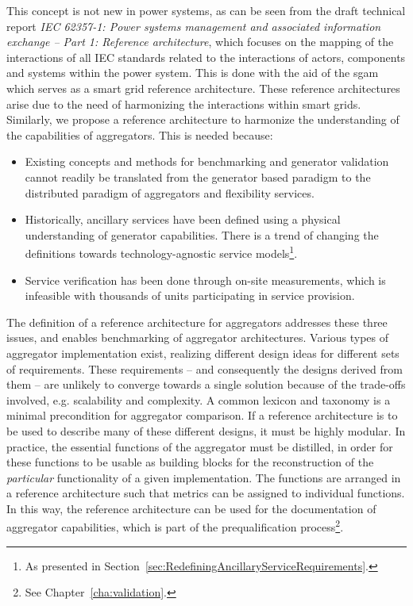This concept is not new in power systems, as can be seen from the draft technical report \emph{IEC 62357-1: Power systems management and associated information exchange -- Part 1: Reference architecture}, which focuses on the mapping of the interactions of all IEC standards related to the interactions of actors, components and systems within the power system. This is done with the aid of the \gls{sgam} which serves as a smart grid reference architecture. These reference architectures arise due to the need of harmonizing the interactions within smart grids. Similarly, we propose a reference architecture to harmonize the understanding of the capabilities of aggregators. This is needed because:
\begin{itemize}
	\item Existing concepts and methods for benchmarking and generator validation cannot readily be translated from the generator based paradigm to the distributed paradigm of aggregators and flexibility services.
	\item Historically, ancillary services have been defined using a physical understanding of generator capabilities. There is a trend of changing the definitions towards technology-agnostic service models\footnote{As presented in Section~\ref{sec:RedefiningAncillaryServiceRequirements}.}.
	\item Service verification has been done through on-site measurements, which is infeasible with thousands of units participating in service provision.
\end{itemize}

The definition of a reference architecture for aggregators addresses these three issues, and enables benchmarking of aggregator architectures.
Various types of aggregator implementation exist, realizing different design ideas for different sets of requirements. These requirements -- and consequently the designs derived from them -- are unlikely to converge towards a single solution because of the trade-offs involved, e.g. scalability and complexity. A common lexicon and taxonomy is a minimal precondition for aggregator comparison.
If a reference architecture is to be used to describe many of these different designs, it must be highly modular. In practice, the essential functions of the aggregator must be distilled, in order for these functions to be usable as building blocks for the reconstruction of the \emph{particular} functionality of a given implementation. 
The functions are arranged in a reference architecture such that metrics can be assigned to individual functions. In this way, the reference architecture can be used for the documentation of aggregator capabilities, which is part of the prequalification process\footnote{See Chapter~\ref{cha:validation}.}.%


